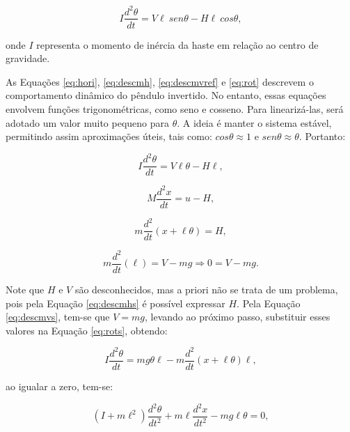 \documentclass[12pt,           %
a4paper,                       %
openany,                       %
oneside,                       %
chapter=TITLE,                 %
english,                       %
spanish,                       %
brazil,                        %
sumario=tradicional]{abntex2}  %
\begin{document}
\begin{OnehalfSpace}
\begin{equation}
    I\frac{d^2\theta}{dt} = V\ell\:sen\theta - H\ell\:cos\theta,
    \label{eq:rot}
\end{equation}

\noindent onde $I$ representa o momento de inércia da haste em relação ao centro de gravidade.

As Equações \ref{eq:hori}, \ref{eq:descmh}, \ref{eq:descmvref} e \ref{eq:rot} descrevem o comportamento dinâmico do pêndulo invertido. No entanto, essas equações envolvem funções trigonométricas, como seno e cosseno. Para linearizá-las, será adotado um valor muito pequeno para $\theta$. A ideia é manter o sistema estável, permitindo assim aproximações úteis, tais como:  $cos\theta \approx 1$ e $sen\theta \approx \theta$. Portanto:

\begin{equation}
    I\frac{d^2\theta}{dt} = V\ell\theta - H\ell,
    \label{eq:rots}
\end{equation}

\begin{equation}
    M\frac{d^2x}{dt} = u - H,
    \label{eq:horis}
\end{equation}

\begin{equation}
    m\frac{d^2}{dt}(x+\ell\theta) = H,
    \label{eq:descmhs}
\end{equation}

\begin{equation}
    m\frac{d^2}{dt}(\ell) = V - mg\Longrightarrow  0 = V-mg.
    \label{eq:descmvs}
\end{equation}

Note que $H$ e $V$ são desconhecidos, mas a priori não se trata de um problema, pois pela Equação \ref{eq:descmhs} é possível expressar $H$. Pela Equação \ref{eq:descmvs}, tem-se que $V = mg$, levando ao próximo passo, substituir esses valores na Equação \ref{eq:rots}, obtendo:

\begin{equation}
    I\frac{d^2\theta}{dt} = mg\theta\ell-m \frac{d^2}{dt} (x+\ell\theta)\ell,
    \label{eq:HeV}
\end{equation}

\noindent ao igualar a zero, tem-se:

\begin{equation}
    (I + m\ell^2)\frac{d^2\theta}{dt^2} + m\ell\frac{d^2x}{dt^2} - mg\ell\theta = 0,
    \label{eq:HeV0}
\end{equation}


\end{OnehalfSpace}
\end{document}
